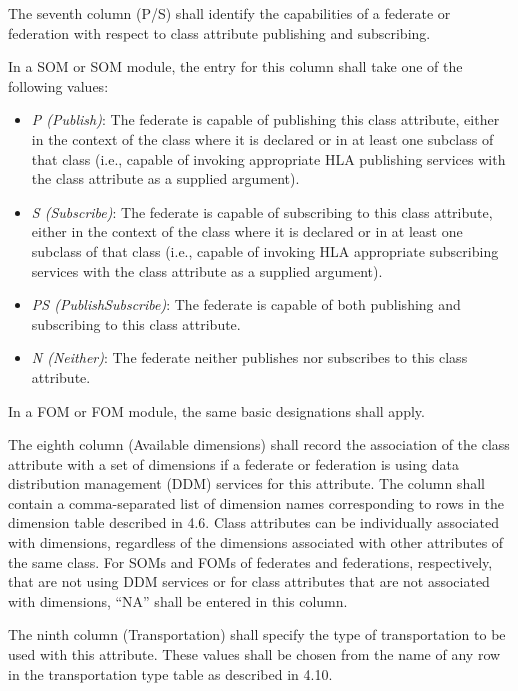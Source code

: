 The seventh column (P/S) shall identify the capabilities of a federate or federation with respect to class attribute publishing and subscribing.

In a SOM or SOM module, the entry for this column shall take one of the following values:
\begin{itemize}[topsep=1pt,itemsep=2pt]
\item \textit{P (Publish)}: The federate is capable of publishing this class attribute, either in the context of the class where it is declared or in at least one subclass of that class (i.e., capable of invoking appropriate HLA publishing services with the class attribute as a supplied argument).
\item \textit{S (Subscribe)}: The federate is capable of subscribing to this class attribute, either in the context of the class where it is declared or in at least one subclass of that class (i.e., capable of invoking HLA appropriate subscribing services with the class attribute as a supplied argument).
\item \textit{PS (PublishSubscribe)}: The federate is capable of both publishing and subscribing to this class attribute.
\item \textit{N (Neither)}: The federate neither publishes nor subscribes to this class attribute.
\end{itemize}

\newpage
In a FOM or FOM module, the same basic designations shall apply.

The eighth column (Available dimensions) shall record the association of the class attribute with a set of dimensions if a federate or federation is using data distribution management (DDM) services for this attribute. The column shall contain a comma-separated list of dimension names corresponding to rows in the dimension table described in 4.6. Class attributes can be individually associated with dimensions, regardless of the dimensions associated with other attributes of the same class. For SOMs and FOMs of federates and federations, respectively, that are not using DDM services or for class attributes that are not associated with dimensions, ``NA'' shall be entered in this column.

The ninth column (Transportation) shall specify the type of transportation to be used with this attribute. These values shall be chosen from the name of any row in the transportation type table as described in 4.10.

